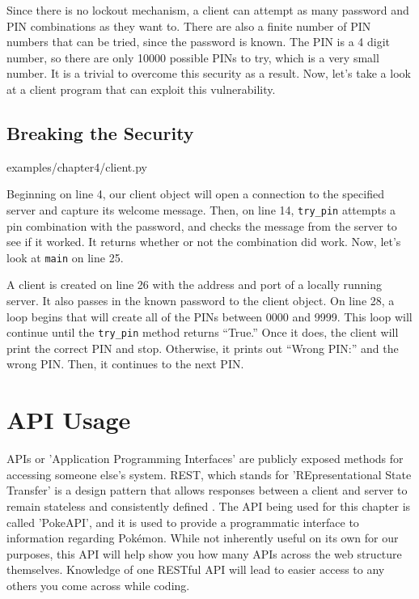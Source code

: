 \documentclass[12pt, oneside, a4paper]{book}
\begin{document}
      Since there is no lockout mechanism, a client can attempt as many password and PIN combinations as they want to.
      There are also a finite number of PIN numbers that can be tried, since the password is known.
      The PIN is a 4 digit number, so there are only 10000 possible PINs to try, which is a very small number.
      It is a trivial to overcome this security as a result.
      Now, let's take a look at a client program that can exploit this vulnerability.
      \subsection{Breaking the Security}

      
      {examples/chapter4/client.py}

      Beginning on line 4, our client object will open a connection to the specified server and capture its welcome message.
      Then, on line 14, \lstinline!try_pin! attempts a pin combination with the password, and checks the message from the server to see if it worked.
      It returns whether or not the combination did work.
      Now, let's look at \lstinline!main! on line 25.

      A client is created on line 26 with the address and port of a locally running server.
      It also passes in the known password to the client object.
      On line 28, a loop begins that will create all of the PINs between 0000 and 9999.
      This loop will continue until the \lstinline!try_pin! method returns ``True.''
      Once it does, the client will print the correct PIN and stop.
      Otherwise, it prints out ``Wrong PIN:'' and the wrong PIN.
      Then, it continues to the next PIN.
      \section{API Usage}
      APIs or 'Application Programming Interfaces' are publicly exposed methods for accessing someone else's system.
      REST, which stands for 'REpresentational State Transfer' is a design pattern that allows responses between a client and server to remain stateless and consistently defined \autocite{hallettPokeAPI}.
      The API being used for this chapter is called 'PokeAPI', and it is used to provide a programmatic interface to information regarding Pokémon.
      While not inherently useful on its own for our purposes, this API will help show you how many APIs across the web structure themselves.
      Knowledge of one RESTful API will lead to easier access to any others you come across while coding.
\end{document}
